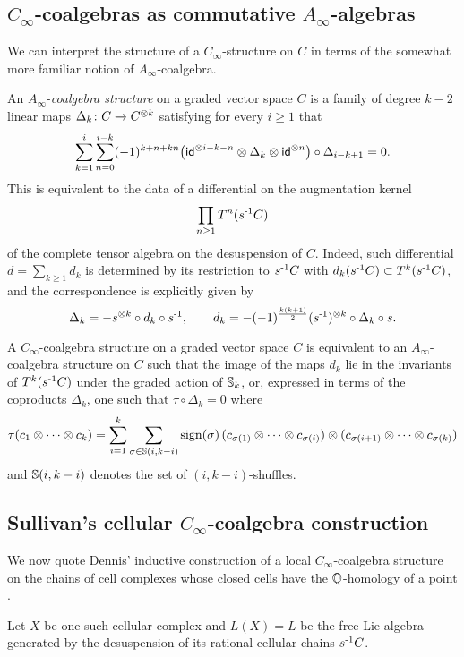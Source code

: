 \subsection{$C_\infty$-coalgebras as commutative $A_\infty$-algebras}

We can interpret the structure of a $C_\infty$-structure on $C$ in terms of the somewhat more familiar notion of $A_\infty$-coalgebra.

An $A_\infty$-\textit{coalgebra structure} on a graded vector space $C$ is a family of degree $k-2$ linear maps $\Delta_k \colon C \to C^{\otimes k}$ satisfying for every $i \geq 1$ that
\[
\sum_{k=1}^{i} \sum_{n=0}^{i-k} (-1)^{k+n+kn} \big( \mathsf{id}^{\otimes i-k-n} \otimes \Delta_k \otimes \mathsf{id}^{\otimes n} \big) \circ \Delta_{i-k+1} = 0.
\]
This is equivalent to the data of a differential on the augmentation kernel
\[
\prod_{n \geq 1} T^n(s^{\mbox{\scriptsize -1}} C)
\]
of the complete tensor algebra on the desuspension of $C$.
Indeed, such differential $d = \sum_{k \geq 1} d_k$ is determined by its restriction to $s^{\mbox{\scriptsize -1}} C$ with $d_k(s^{\mbox{\scriptsize -1}} C) \subset T^k(s^{\mbox{\scriptsize -1}} C)$, and the correspondence is explicitly given by
\[
\Delta_k = - s^{\otimes k} \circ d_k \circ s^{\mbox{\scriptsize -1}},
\qquad
d_k = -(-1)^{\frac{k(k+1)}{2}} (s^{\mbox{\scriptsize -1}})^{\otimes k} \circ \Delta_k \circ s.
\]

A $C_\infty$-coalgebra structure on a graded vector space $C$ is equivalent to an $A_\infty$-coalgebra structure on $C$ such that the image of the maps $d_k$ lie in the invariants of $T^k(s^{\mbox{\scriptsize -1}} C)$ under the graded action of $\mathbb{S}_k$, or, expressed in terms of the coproducts $\Delta_k$, one such that $\tau \circ \Delta_k = 0$ where
\[
\tau(c_1 \otimes \dotsb \otimes c_k) =
\sum_{i=1}^{k} \sum_{\sigma \in \mathbb{S}(i, k-i)} \operatorname{sign}(\sigma) \,
(c_{\sigma(1)} \otimes \dotsb \otimes c_{\sigma(i)}) \otimes
(c_{\sigma(i+1)} \otimes \dotsb \otimes c_{\sigma(k)})
\]
and $\mathbb{S}(i, k-i)$ denotes the set of $(i, k-i)$-shuffles.

\subsection{Sullivan's cellular $C_\infty$-coalgebra construction} \label{ss:dennis construction}

We now quote Dennis' inductive construction of a local $C_\infty$-coalgebra structure on the chains of cell complexes whose closed cells have the $\mathbb{Q}$-homology of a point \cite{sullivan2007appendix}.

Let $X$ be one such cellular complex and $L(X) = L$ be the free Lie algebra generated by the desuspension of its rational cellular chains $s^{\mbox{\scriptsize -1}}C$.

